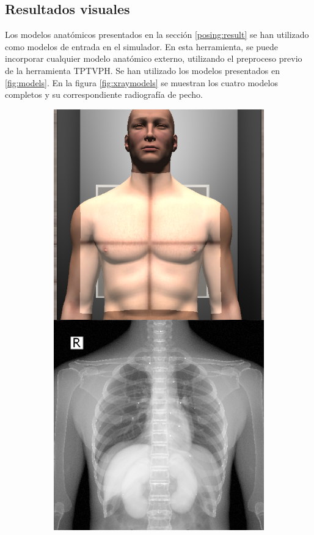 \subsection{Resultados visuales}

Los modelos anatómicos presentados en la sección \ref{posing:result} se han utilizado como modelos de entrada en el simulador. En esta herramienta, se puede incorporar cualquier modelo anatómico externo, utilizando el preproceso previo de la herramienta \ac{TPTVPH}. Se han utilizado los modelos presentados en \ref{fig:models}. En la figura \ref{fig:xraymodels} se muestran los cuatro modelos completos y su correspondiente radiografía de pecho.

\begin{figure}[h]
    \begin{subfigure}[b]{0.24\linewidth}
        \centering
        {\includegraphics[width=\linewidth]{IMG/zygoteex.png}}

\end{subfigure}
\end{figure}
